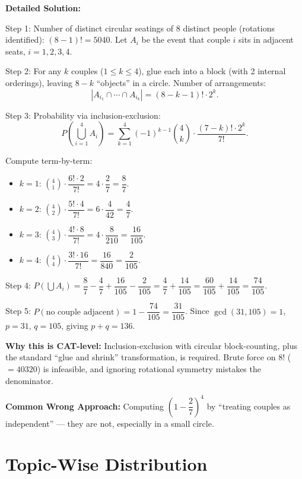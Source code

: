 \documentclass[11pt,a4paper]{article}
\begin{document}
\textbf{Detailed Solution:}

Step 1: Number of distinct circular seatings of 8 distinct people (rotations identified): \((8-1)! = 5040\). Let \(A_i\) be the event that couple \(i\) sits in adjacent seats, \(i = 1, 2, 3, 4\).

Step 2: For any \(k\) couples (\(1 \leq k \leq 4\)), glue each into a block (with 2 internal orderings), leaving \(8 - k\) ``objects'' in a circle. Number of arrangements:
\[
|A_{i_1} \cap \cdots \cap A_{i_k}| = (8 - k - 1)! \cdot 2^k.
\]

Step 3: Probability via inclusion-exclusion:
\[
P\!\left(\bigcup_{i=1}^{4} A_i\right) = \sum_{k=1}^{4} (-1)^{k-1} \binom{4}{k} \cdot \frac{(7-k)! \cdot 2^k}{7!}.
\]

Compute term-by-term:
\begin{itemize}[leftmargin=*,topsep=0pt,itemsep=0pt]
    \item \(k = 1\): \(\binom{4}{1} \cdot \dfrac{6! \cdot 2}{7!} = 4 \cdot \dfrac{2}{7} = \dfrac{8}{7}\).
    \item \(k = 2\): \(\binom{4}{2} \cdot \dfrac{5! \cdot 4}{7!} = 6 \cdot \dfrac{4}{42} = \dfrac{4}{7}\).
    \item \(k = 3\): \(\binom{4}{3} \cdot \dfrac{4! \cdot 8}{7!} = 4 \cdot \dfrac{8}{210} = \dfrac{16}{105}\).
    \item \(k = 4\): \(\binom{4}{4} \cdot \dfrac{3! \cdot 16}{7!} = \dfrac{16}{840} = \dfrac{2}{105}\).
\end{itemize}

Step 4: \(P(\bigcup A_i) = \dfrac{8}{7} - \dfrac{4}{7} + \dfrac{16}{105} - \dfrac{2}{105} = \dfrac{4}{7} + \dfrac{14}{105} = \dfrac{60}{105} + \dfrac{14}{105} = \dfrac{74}{105}\).

Step 5: \(P(\text{no couple adjacent}) = 1 - \dfrac{74}{105} = \dfrac{31}{105}\). Since \(\gcd(31, 105) = 1\), \(p = 31\), \(q = 105\), giving \(p + q = 136\).

\textbf{Why this is CAT-level:} Inclusion-exclusion with circular block-counting, plus the standard ``glue and shrink'' transformation, is required. Brute force on \(8!\) (\(=40320\)) is infeasible, and ignoring rotational symmetry mistakes the denominator.

\textbf{Common Wrong Approach:} Computing \(\left(1 - \dfrac{2}{7}\right)^4\) by ``treating couples as independent'' --- they are not, especially in a small circle.

\newpage

\section*{Topic-Wise Distribution}
\end{document}

